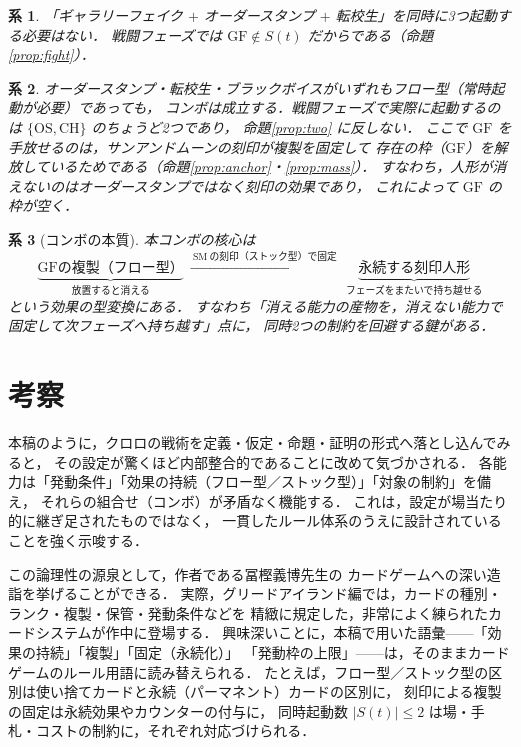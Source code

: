 \documentclass[a4paper,12pt]{jarticle}
\theoremstyle{definition}
\theoremstyle{plain}
\newtheorem{cor}{系}
\theoremstyle{definition}
\theoremstyle{remark}
\newcommand{\Act}{S}   %
\newcommand{\GF}{\mathrm{GF}}    %
\newcommand{\OS}{\mathrm{OS}}    %
\newcommand{\CH}{\mathrm{CH}}    %
\newcommand{\SM}{\mathrm{SM}}    %
\begin{document}
\begin{cor}
「ギャラリーフェイク $+$ オーダースタンプ $+$ 転校生」を同時に3つ起動する必要はない．
戦闘フェーズでは $\GF\notin\Act(t)$ だからである（命題\ref{prop:fight}）．
\end{cor}

\begin{cor}
オーダースタンプ・転校生・ブラックボイスがいずれもフロー型（常時起動が必要）であっても，
コンボは成立する．戦闘フェーズで実際に起動するのは $\{\OS,\CH\}$ のちょうど2つであり，
命題\ref{prop:two} に反しない．
ここで $\GF$ を手放せるのは，サンアンドムーンの刻印が複製を固定して
{存在の枠（$\GF$）を解放している}ためである（命題\ref{prop:anchor}・\ref{prop:mass}）．
すなわち，人形が消えないのはオーダースタンプではなく{刻印}の効果であり，
これによって $\GF$ の枠が空く．
\end{cor}

\begin{cor}[コンボの本質]
本コンボの核心は
\[
\underbrace{\text{GFの複製（フロー型）}}_{\text{放置すると消える}}
\ \xrightarrow{\ \SM\ \text{の刻印（ストック型）で固定}\ }\
\underbrace{\text{永続する刻印人形}}_{\text{フェーズをまたいで持ち越せる}}
\]
という{効果の型変換}にある．
すなわち「消える能力の産物を，消えない能力で固定して次フェーズへ持ち越す」点に，
同時2つの制約を回避する鍵がある．
\end{cor}

\section{考察}

本稿のように，クロロの戦術を定義・仮定・命題・証明の形式へ落とし込んでみると，
その設定が驚くほど{内部整合的}であることに改めて気づかされる．
各能力は「発動条件」「効果の持続（フロー型／ストック型）」「対象の制約」を備え，
それらの組合せ（コンボ）が矛盾なく機能する．
これは，設定が場当たり的に継ぎ足されたものではなく，
一貫したルール体系のうえに設計されていることを強く示唆する．

この論理性の源泉として，作者である冨樫義博先生の
{カードゲームへの深い造詣}を挙げることができる．
実際，グリードアイランド編では，カードの種別・ランク・複製・保管・発動条件などを
精緻に規定した，非常によく練られたカードシステムが作中に登場する．
興味深いことに，本稿で用いた語彙——「効果の持続」「複製」「固定（永続化）」
「発動枠の上限」——は，そのままカードゲームのルール用語に読み替えられる．
たとえば，フロー型／ストック型の区別は使い捨てカードと永続（パーマネント）カードの区別に，
刻印による複製の固定は永続効果やカウンターの付与に，
同時起動数 $|\Act(t)|\le2$ は場・手札・コストの制約に，それぞれ対応づけられる．
\end{document}
